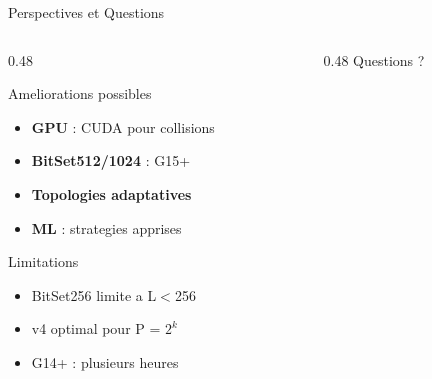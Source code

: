 \documentclass[aspectratio=169,9pt]{beamer}
\begin{document}
\begin{frame}{Perspectives et Questions}
    \begin{columns}[T]
        \begin{column}{0.48\textwidth}
            \begin{block}{Ameliorations possibles}
                \begin{itemize}\small
                    \item \textbf{GPU} : CUDA pour collisions
                    \item \textbf{BitSet512/1024} : G15+
                    \item \textbf{Topologies adaptatives}
                    \item \textbf{ML} : strategies apprises
                \end{itemize}
            \end{block}
            \begin{alertblock}{Limitations}
                \small
                \begin{itemize}
                    \item BitSet256 limite a L$<$256
                    \item v4 optimal pour P = $2^k$
                    \item G14+ : plusieurs heures
                \end{itemize}
            \end{alertblock}
        \end{column}
        \begin{column}{0.48\textwidth}
            \centering
            \vspace{0.5cm}
            {\Huge\color{urcablue} Questions ?}
            \vspace{0.8cm}
        \end{column}
    \end{columns}
\end{frame}
\end{document}
